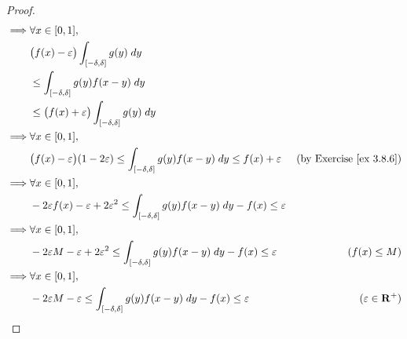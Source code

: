 \begin{proof}
\begin{align*}
        \implies & \forall x \in [0, 1],                                                                                                                                               \\
                 & \big(f(x) - \varepsilon\big) \int_{[-\delta, \delta]} g(y) \; dy                                                                                                    \\
                 & \leq \int_{[-\delta, \delta]} g(y) f(x - y) \; dy                                                                                                                   \\
                 & \leq \big(f(x) + \varepsilon\big) \int_{[-\delta, \delta]} g(y) \; dy                                                                                               \\
        \implies & \forall x \in [0, 1],                                                                                                                                               \\
                 & \big(f(x) - \varepsilon\big) (1 - 2 \varepsilon) \leq \int_{[-\delta, \delta]} g(y) f(x - y) \; dy \leq f(x) + \varepsilon    & \text{(by Exercise \ref{ex 3.8.6})} \\
        \implies & \forall x \in [0, 1],                                                                                                                                               \\
                 & -2 \varepsilon f(x) - \varepsilon + 2 \varepsilon^2 \leq \int_{[-\delta, \delta]} g(y) f(x - y) \; dy - f(x) \leq \varepsilon                                       \\
        \implies & \forall x \in [0, 1],                                                                                                                                               \\
                 & -2 \varepsilon M - \varepsilon + 2 \varepsilon^2 \leq \int_{[-\delta, \delta]} g(y) f(x - y) \; dy - f(x) \leq \varepsilon    & (f(x) \leq M)                       \\
        \implies & \forall x \in [0, 1],                                                                                                                                               \\
                 & -2 \varepsilon M - \varepsilon \leq \int_{[-\delta, \delta]} g(y) f(x - y) \; dy - f(x) \leq \varepsilon                      & (\varepsilon \in \mathbf{R}^+)      \\

\end{align*}
\end{proof}

